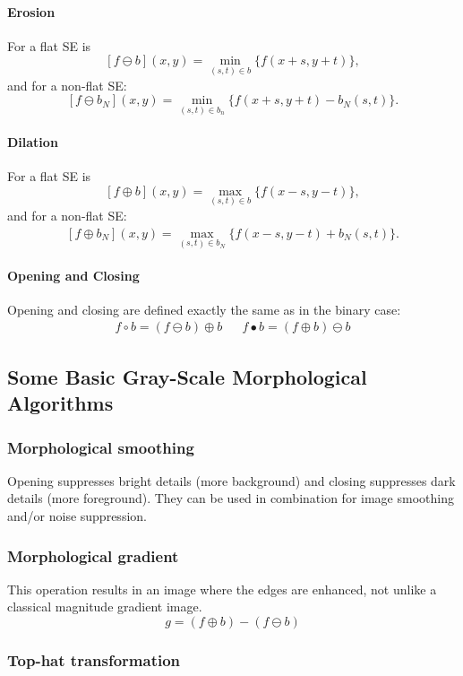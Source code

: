\paragraph{Erosion}
For a flat SE is
\[
	[f \ominus b](x,y)	= \min_{(s,t)\in b} \{f(x+s,y+t)\},
\]
and for a non-flat SE:
\[
	[f \ominus b_N](x,y)	= \min_{(s,t)\in b_n} \{f(x+s,y+t) -b_N(s,t)\}.
\]

\paragraph{Dilation}
For a flat SE is
\[
	[f\oplus b](x,y)	= \max_{(s,t)\in b} \{f(x-s,y-t)\},
\]
and for a non-flat SE:
\[
	[f\oplus b_N](x,y)	= \max_{(s,t)\in b_N} \{f(x-s,y-t) + \hat{b}_N(s,t)\}.
\]

\paragraph{Opening and Closing}
Opening and closing are defined exactly the same as in the binary case:
\begin{align*}
	f \circ b = (f \ominus b) \oplus b &&
	f \bullet b = (f \oplus b) \ominus b
\end{align*}

\subsection{Some Basic Gray-Scale Morphological Algorithms}

\subsubsection{Morphological smoothing}

Opening suppresses bright details (more background) and closing suppresses dark details (more foreground). They can be used in combination for image smoothing and/or noise suppression.

\subsubsection{Morphological gradient}

This operation results in an image where the edges are enhanced, not unlike a classical magnitude gradient image.
\[
	g=(f\oplus b)-(f\ominus b)
\]

\subsubsection{Top-hat transformation}

